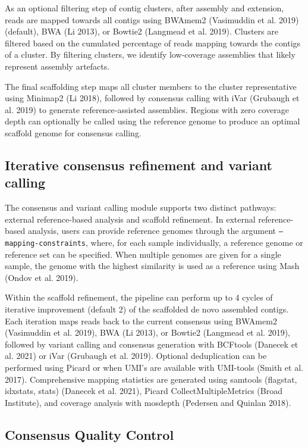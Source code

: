 As an optional filtering step of contig clusters, after assembly and extension, reads are mapped towards all contigs using BWAmem2 (Vasimuddin et al. 2019) (default), BWA (Li 2013), or Bowtie2 (Langmead et al. 2019). Clusters are filtered based on the cumulated percentage of reads mapping towards the contigs of a cluster. By filtering clusters, we identify low-coverage assemblies that likely represent assembly artefacts.

The final scaffolding step maps all cluster members to the cluster representative using Minimap2 (Li 2018), followed by consensus calling with iVar (Grubaugh et al. 2019) to generate reference-assisted assemblies. Regions with zero coverage depth can optionally be called using the reference genome to produce an optimal scaffold genome for consensus calling.

\subsection{Iterative consensus refinement and variant calling}

The consensus and variant calling module supports two distinct pathways: external reference-based analysis and scaffold refinement. In external reference-based analysis, users can provide reference genomes through the argument \texttt{--mapping-constraints}, where, for each sample individually, a reference genome or reference set can be specified. When multiple genomes are given for a single sample, the genome with the highest similarity is used as a reference using Mash (Ondov et al. 2019).

Within the scaffold refinement, the pipeline can perform up to 4 cycles of iterative improvement (default 2) of the scaffolded de novo assembled contigs. Each iteration maps reads back to the current consensus using BWAmem2 (Vasimuddin et al. 2019), BWA (Li 2013), or Bowtie2 (Langmead et al. 2019), followed by variant calling and consensus generation with BCFtools (Danecek et al. 2021) or iVar (Grubaugh et al. 2019). Optional deduplication can be performed using Picard or when UMI's are available with UMI-tools (Smith et al. 2017). Comprehensive mapping statistics are generated using samtools (flagstat, idxstats, stats) (Danecek et al. 2021), Picard CollectMultipleMetrics (Broad Institute), and coverage analysis with mosdepth (Pedersen and Quinlan 2018).

\subsection{Consensus Quality Control}

